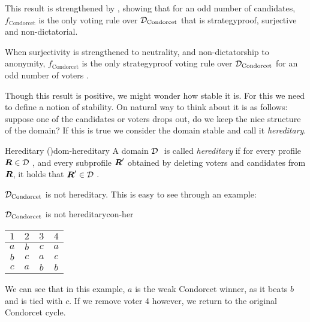 This result is strengthened by
\citet{campbellNonmonotonicityDoesNot2002,campbellCorrectionStrategyproofnessCharacterization2016},
showing that for an odd number of candidates, \(f_{\text{Condorcet}}\) is the
only voting rule over \(\mathcal{D}_{\textnormal{Condorcet}}\) that is strategyproof, surjective
and non-dictatorial.

When surjectivity is strengthened to neutrality, and non-dictatorship to
anonymity, \linebreak \(f_{\text{Condorcet}}\) is the only strategyproof voting
rule over \(\mathcal{D}_{\textnormal{Condorcet}}\) for an odd number of voters
\cite{campbellAnonymousNeutralStrategyproof2015}.


Though this result is positive, we might wonder how stable it is. For this we
need to define a notion of stability. On natural way to think about it is as
follows: suppose one of the candidates or voters drops out, do we keep the nice
structure of the domain? If this is true we consider the domain stable and call
it \emph{hereditary}.

\begin{definition}{Hereditary \textnormal{(\citet{elkindPreferenceRestrictionsComputational2022})}}{dom-hereditary}
	A domain $\mathcal{D}_{\textnormal{ }}$ is called \emph{hereditary} if for
	every profile $\boldsymbol{R} \in \mathcal{D}_{\textnormal{ }}$, and every subprofile $\boldsymbol{R}'$
	obtained by deleting voters and candidates from $\boldsymbol{R}$, it holds that $\boldsymbol{R}' \in \mathcal{D}_{\textnormal{ }}$.
\end{definition}

$\mathcal{D}_{\textnormal{Condorcet}}$ is not hereditary. This is easy to see through an example:

\begin{example}{$\mathcal{D}_{\textnormal{Condorcet}}$ is not hereditary}{con-her}
	\begin{minipage}{0.25\linewidth}
		\begin{tabular}{cccc}
			\toprule
			$1$ & $2$ & $3$ & $4$ \\
			\midrule
			$a$ & $b$ & $c$ & $a$ \\
			$b$ & $c$ & $a$ & $c$ \\
			$c$ & $a$ & $b$ & $b$ \\
			\bottomrule
		\end{tabular}
	\end{minipage}
	\begin{minipage}[b]{0.70\linewidth}
		We can see that in this example, $a$ is the weak Condorcet
		winner, as it beats $b$ and is tied with $c$. If we
		remove voter 4 however, we return to the original Condorcet cycle.
	\end{minipage}
\end{example}

